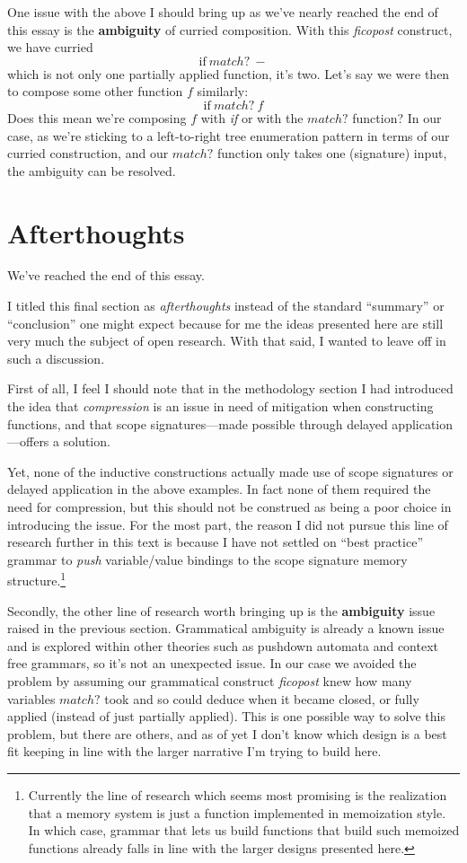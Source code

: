 \documentclass[twoside]{article}
\newcommand{\strong}[1]{{\bfseries #1}}
\begin{document}
One issue with the above I should bring up as we've nearly reached the end of this essay is the \strong{ambiguity}
of curried composition. With this \emph{ficopost} construct, we have curried 
$$ \mbox{if}\ match?\ - $$
which is not only one partially applied function, it's two.
Let's say we were then to compose some other function $ f $ similarly:
$$ \mbox{if}\ match?\ f $$
Does this mean we're composing $ f $ with \emph{if} or with the $ match? $ function? In our case, as we're sticking
to a left-to-right tree enumeration pattern in terms of our curried construction, and our $ match? $ function only
takes one (signature) input, the ambiguity can be resolved.

\section*{Afterthoughts}

We've reached the end of this essay.

I titled this final section as \emph{afterthoughts} instead of the standard ``summary'' or ``conclusion''
one might expect because for me the ideas presented here are still very much the subject of open research.
With that said, I wanted to leave off in such a discussion.

First of all, I feel I should note that in the methodology section I had introduced the idea that \emph{compression}
is an issue in need of mitigation when constructing functions, and that scope signatures---made possible through delayed
application---offers a solution.

Yet, none of the inductive constructions actually made use of scope signatures or delayed application in the above
examples. In fact none of them required the need for compression, but this should not be construed as being a poor
choice in introducing the issue.  For the most part, the reason I did not pursue this line of research further in
this text is because I have not settled on ``best practice'' grammar to \emph{push} variable/value bindings to the
scope signature memory structure.\footnote{Currently the line of research which seems most promising is the realization
that a memory system is just a function implemented in memoization style. In which case, grammar that lets us build
functions that build such memoized functions already falls in line with the larger designs presented here.}

Secondly, the other line of research worth bringing up is the \strong{ambiguity} issue raised in the previous section.
Grammatical ambiguity is already a known issue and is explored within other theories such as pushdown automata and
context free grammars, so it's not an unexpected issue. In our case we avoided the problem by assuming our grammatical
construct \emph{ficopost} knew how many variables $ match? $ took and so could deduce when it became closed, or fully
applied (instead of just partially applied). This is one possible way to solve this problem, but there are others,
and as of yet I don't know which design is a best fit keeping in line with the larger narrative I'm trying to build here.
\end{document}
